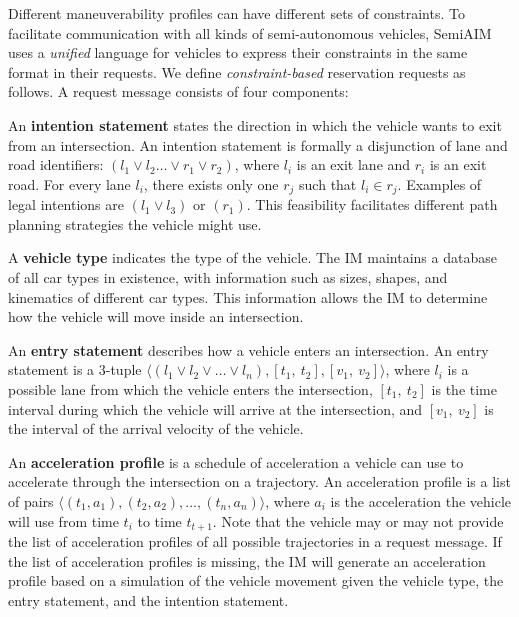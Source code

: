 Different maneuverability profiles can have different sets of
constraints.  To facilitate communication with all kinds of
semi-autonomous vehicles, SemiAIM uses a \emph{unified} language for
vehicles to express their constraints in the same format in their
requests.  We define \emph{constraint-based} reservation requests as
follows.  A request message consists of four components:
\begin{small_ind_s_itemize}

\item An \textbf{intention statement} states the direction in which
the vehicle wants to exit from an intersection. An intention statement
is formally a disjunction of lane and road identifiers: $(l_1 \vee l_2
\ldots \vee r_1 \vee r_2)$, where $l_i$ is an exit lane and $r_i$ is
an exit road. For every lane $l_i$, there exists only one $r_j$ such
that $l_i \in r_j$.  Examples of legal intentions are $(l_1 \vee l_3)$
or $(r_1)$.  This feasibility facilitates different path planning
strategies the vehicle might use.

\item A \textbf{vehicle type} indicates the type of the vehicle.  The
IM maintains a database of all car types in existence, with
information such as sizes, shapes, and kinematics of different car
types. This information allows the IM to determine how the vehicle
will move inside an intersection.

\item An \textbf{entry statement} describes how a vehicle enters an
intersection.  An entry statement is a $3$-tuple $\langle (l_1 \vee
l_2 \vee \ldots \vee l_n), [t_1,\ t_2], [v_1,\ v_2] \rangle$, where
$l_i$ is a possible lane from which the vehicle enters the
intersection, $[t_1,\ t_2]$ is the time interval during which the
vehicle will arrive at the intersection, and $[v_1,\ v_2]$ is the
interval of the arrival velocity of the vehicle.

\item An \textbf{acceleration profile} is a schedule of acceleration a
vehicle can use to accelerate through the intersection on a
trajectory. An acceleration profile is a list of pairs $\langle (t_1,
a_1), (t_2, a_2), \ldots, (t_n, a_n) \rangle$, where $a_i$ is the
acceleration the vehicle will use from time $t_i$ to time $t_{t+1}$.
Note that the vehicle may or may not provide the list of acceleration
profiles of all possible trajectories in a request message.  If the
list of acceleration profiles is missing, the IM will generate an
acceleration profile based on a simulation of the vehicle movement
given the vehicle type, the entry statement, and the intention
statement.

\end{small_ind_s_itemize}


